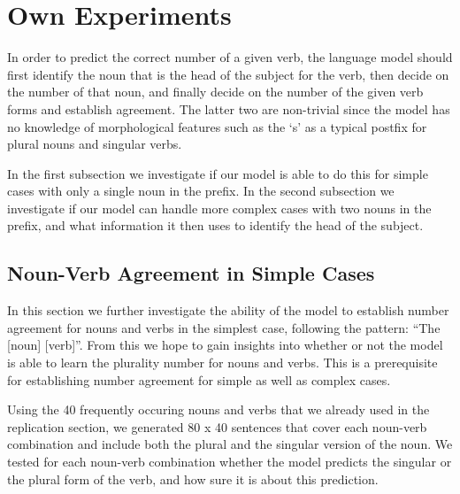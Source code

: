 \section{Own Experiments}
\label{own-experiments}
In order to predict the correct number of a given verb,
the language model should first
identify the noun that is the head of the subject for the verb,
then decide on the number of that noun,
and finally decide on the number of the given verb forms and
establish agreement.
The latter two are non-trivial since the model has no knowledge
of morphological features such as the `s' as a typical postfix
for plural nouns and singular verbs. 

In the first subsection we investigate if our model is able to
do this for simple cases with only a single noun in the prefix.
%
In the second subsection we investigate if our model can handle
more complex cases with two nouns in the prefix,
and what information it then uses to identify the head of the subject.


\subsection{Noun-Verb Agreement in Simple Cases}

In this section we further investigate the ability of the model to
establish number agreement for nouns and verbs in the simplest case,
following the pattern: ``The [noun] [verb]''. 
From this we hope to gain insights into whether or not the model is able 
to learn the plurality number for nouns and verbs.
This is a prerequisite for establishing number agreement
for simple as well as complex cases.

Using the 40 frequently occuring nouns and verbs that we already used in the replication section, we generated 80 x 40 sentences that cover each noun-verb combination and include both the plural and the singular version of the noun. 
We tested for each noun-verb combination whether the model 
predicts the singular or the plural form of the verb,
and how sure it is about this prediction.

